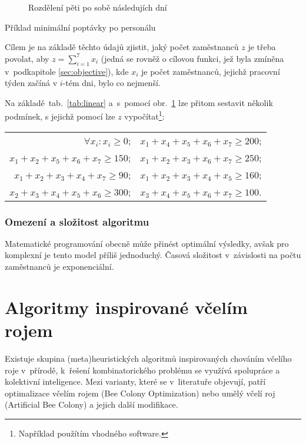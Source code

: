 \documentclass[twoside]{ctuthesis}
\begin{document}
\begin{figure}[h]
	
	\caption{Rozdělení pěti po sobě následujích dní}
	\label{fig:linear}
\end{figure}

\begin{table}[h]
	
	\caption{Příklad minimální poptávky po personálu}
	\label{tab:linear}
\end{table}

Cílem je na základě těchto údajů zjistit, jaký počet zaměstnanců $z$ je třeba povolat, aby $z = \sum_{i=1}^{7} x_i$ (jedná se rovněž o cílovou funkci, jež byla zmíněna v~podkapitole \ref{sec:objective}), kde $x_i$ je počet zaměstnanců, jejichž pracovní týden začíná v $i$-tém dni, bylo co nejmenší.

Na základě~tab.~\ref{tab:linear} a~s~pomocí obr.~\ref{fig:linear} lze přitom sestavit několik podmínek, s jejichž pomocí lze $z$ vypočítat\footnote{Například použítím vhodného software.}:
\begin{center}
	\begin{tabular}{rl}
		$\forall x_i: x_i \geq 0$; & $x_1 + x_4 + x_5 + x_6 + x_7 \geq 200$; \\
		$x_1 + x_2 + x_5 + x_6 + x_7 \geq 150$; & $x_1 + x_2 + x_3 + x_6 + x_7 \geq 250$;\\
		$x_1 + x_2 + x_3 + x_4 + x_7 \geq 90$; & $x_1 + x_2 + x_3 + x_4 + x_5 \geq 160$; \\
		$x_2 + x_3 + x_4 + x_5 + x_6 \geq 300$; & $x_3 + x_4 + x_5 + x_6 + x_7 \geq 100$.
	\end{tabular}
\end{center}

\subsubsection{Omezení a složitost algoritmu}
Matematické programování obecně může přinést optimální výsledky, avšak pro komplexní je tento model příliš jednoduchý. \cite{burke2004state} Časová složitost v~závislosti na počtu zaměstnanců je exponenciální. \cite{chen2016comparison}


\newpage
\section{Algoritmy inspirované včelím rojem}
Existuje skupina (meta)heuristických algoritmů inspirovaných chováním včelího roje v~přírodě, k~řešení kombinatorického problému se využívá spolupráce a kolektivní inteligence. Mezi varianty, které se v~literatuře objevují, patří optimalizace včelím rojem (Bee Colony Optimization) nebo umělý včelí roj (Artificial Bee Colony) a jejich další modifikace.
\end{document}
